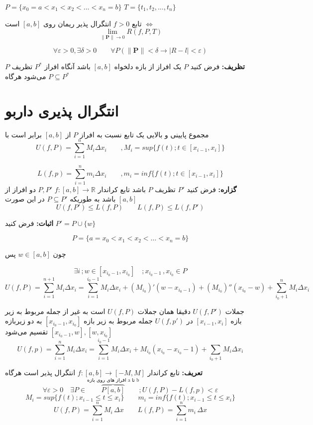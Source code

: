 \documentclass[12pt]{report}
\begin{document}
$P = \{x_0 = a < x_1 < x_2 < \dots < x_n = b\}$ \quad
$T = \{t_1, t_2, \dots, t_n\}$


تابع
$f>0$
انتگرال پذیر ریمان روی 
 $[a, b]$
 است
$\iff$
\[\lim_{ \lVert \mathbf{P} \rVert \to 0} R(f, P, T)
\]

\[
\forall \varepsilon > 0 , \exists \delta>0 \qquad \forall P(\lVert \mathbf{P} \rVert < \delta \rightarrow |R-l|< \varepsilon)
\]

\textbf{تظریف:}
فرض کنید
$P$
 یک افراز از بازه دلخواه
$[a, b]$
باشد آنگاه افراز
 $P^*$
  تظریف $P$  می‌شود هرگاه
$P \subseteq P^*$
 





	\section{انتگرال پذیری داربو}
مجموع پایینی و بالایی یک تابع نسبت به افراز $P$ از
$[a, b]$
برابر است با 
\[
U(f, P) = \sum_{i = 1}^n M_i \Delta x_i \qquad , M_i = sup\{f(t) ; t \in [x_{i - 1}, x_i]\}
\]

\[
L(f, p) = \sum_{i = 1}^n m_i \Delta x_i \qquad , m_i = inf\{f(t) ; t \in [x_{i - 1}, x_i]\}
\]
\textbf{گزاره:}
فرض کنید $P'$ تظریف $P$ باشد تابع کراندار
$f:[a, b] \rightarrow \mathbb{R}$
$P , P'$
دو افراز از 
$[a, b]$
باشد به طوریکه
$P \subseteq P'$
در این صورت
\[
U(f, P') \leq L(f, P) \qquad L(f, P) \leq L(f, P') 
\]

\textbf{اثبات:}
فرض کنید
$ P' = P \cup \{w\}$

\[P = \{a = x_0 < x_1 < x_2 <\dots < x_n = b  \}
\]

چون 
$w \in [a, b]$
پس

\[
\exists i \, ; w\in [x_{i_0 - 1}, x_{i_0}] \quad ; x_{i_0 - 1} \,, x_{i_0} \in P
\]
\[
U(f, P) = \sum_{i = 1}^{n+1}  M_i \Delta x_i = \sum_{i = 1}^{i_{0} - 1} M_i \Delta x_i + (M_{i_0})' (w - x_{i_0 - 1}) + (M_{i_0})'' (x_{i_0} - w) + \sum_{i_0+1}^n M_i \Delta x_i
\]

جملات 
$U(f, P')$
دقیقا همان جملات
$U(f, P)$
است به غیر از جمله مربوط به زیر بازه 
$[x_{i - 1}, x_i]$
در
$U(f, p')$
جمله مربوط به زیر بازه
$[x_{i_0 - 1}, x_{i_0} ]$
به دو زیربازه 
$[x_{i_0 -1}, w] , [w, x_{i_0}]$
تقسیم می‌شود
\[
U(f, p) = \sum_{i = 1}^n M_i \Delta x_i = \sum_{i = 1}^{i_{0} - 1} M_i \Delta x_i + M_{i_0}(x_{i_{0}} - x_{i_0} - 1) + \sum_{i_0+1} M_i \Delta x_i
\] 

\textbf{تعریف:}
تابع کراندار
$f:[a, b] \rightarrow [-M, M]$
انتگرال پذیر است هرگاه
\[
 \forall \varepsilon >0\quad \exists P \in \overbrace{P[a, b]}^{\text{افراز های روی بازه a تا b}} ; U(f, P) - L(f, p) < \varepsilon
\]
\[
M_i = sup\{f(t) ; x_{i - 1} \leq t \leq x_i\} \qquad m_i = inf\{f(t) ; x_{i - 1} \leq t \leq x_i\}
\]
\[
U(f, P) = \sum_{i = 1}^n M_i\, \Delta x \qquad L(f, P) = \sum_{i = 1}^n m_i \, \Delta x
\]
\end{document}
